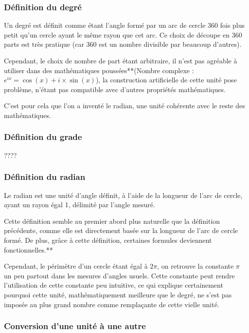 \documentclass[a4paper]{article}
\begin{document}
			\subsubsection{Définition du degré}

				Un degré est définit comme étant l'angle formé par un arc de cercle 360 fois plus petit qu'un cercle ayant le même rayon que cet arc. Ce choix de découpe en 360 parts est très pratique (car 360 est un nombre divisible par beaucoup d'autres). 

				Cependant, le choix de nombre de part étant arbitraire, il n'est pas agréable à utiliser dans des mathématiques poussées**(Nombre complexe : $e^{ix}=\cos(x)+i \times \sin(x)$), la construction artificielle de cette unité pose problème, n'étant pas compatible avec d'autres propriétés mathématiques. 

				C'est pour cela que l'on a inventé le radian, une unité cohérente avec le reste des mathématiques.

			\subsubsection{Définition du grade}

				????

			\subsubsection{Définition du radian}

				Le radian est une unité d'angle définit, à l'aide de la longueur de l'arc de cercle, ayant un rayon égal 1, délimité par l'angle mesuré.

				Cette définition semble au premier abord plus naturelle que la définition précédente, comme elle est directement basée sur la longueur de l'arc de cercle formé. De plus, grâce à cette définition, certaines formules deviennent fonctionnelles.**

				Cependant, le périmètre d'un cercle étant égal à $2 \pi$, on retrouve la constante $\pi$ un peu partout dans les mesures d'angles usuels. Cette constante peut rendre l'utilisation de cette constante peu intuitive, ce qui explique certainement pourquoi cette unité, mathématiquement meilleure que le degré, ne s'est pas imposée au plus grand nombre comme remplaçante de cette vielle unité.

			\subsubsection{Conversion d'une unité à une autre}
\end{document}
